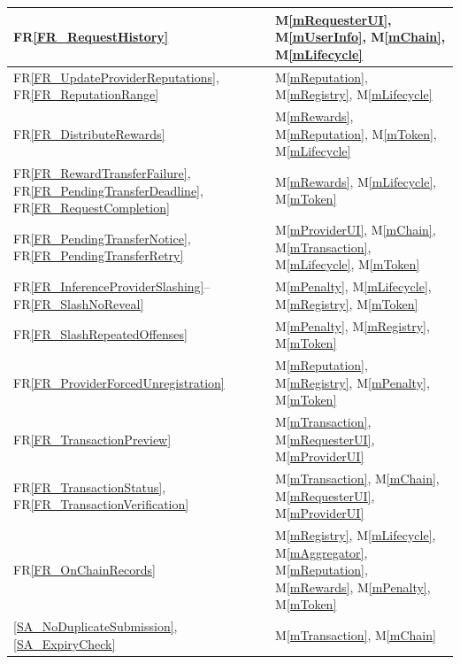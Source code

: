 \documentclass[12pt, titlepage]{article}
\newcommand{\mref}[1]{M\ref{#1}}
\newcommand{\rref}[1]{FR\ref{#1}}
\begin{document}
\begin{longtable}{|p{}|p{}|}
\rref{FR_RequestHistory}
& \mref{mRequesterUI}, \mref{mUserInfo}, \mref{mChain}, \mref{mLifecycle} \\
\hline

\rref{FR_UpdateProviderReputations}, \rref{FR_ReputationRange}
& \mref{mReputation}, \mref{mRegistry}, \mref{mLifecycle} \\
\hline

\rref{FR_DistributeRewards}
& \mref{mRewards}, \mref{mReputation}, \mref{mToken}, \mref{mLifecycle} \\
\hline

\rref{FR_RewardTransferFailure}, \rref{FR_PendingTransferDeadline},
\rref{FR_RequestCompletion}
& \mref{mRewards}, \mref{mLifecycle}, \mref{mToken} \\
\hline

\rref{FR_PendingTransferNotice}, \rref{FR_PendingTransferRetry}
& \mref{mProviderUI}, \mref{mChain}, \mref{mTransaction}, \mref{mLifecycle},
\mref{mToken} \\
\hline

\rref{FR_InferenceProviderSlashing}--\rref{FR_SlashNoReveal}
& \mref{mPenalty}, \mref{mLifecycle}, \mref{mRegistry}, \mref{mToken} \\
\hline

\rref{FR_SlashRepeatedOffenses}
& \mref{mPenalty}, \mref{mRegistry}, \mref{mToken} \\
\hline

\rref{FR_ProviderForcedUnregistration}
& \mref{mReputation}, \mref{mRegistry}, \mref{mPenalty}, \mref{mToken} \\
\hline

\rref{FR_TransactionPreview}
& \mref{mTransaction}, \mref{mRequesterUI}, \mref{mProviderUI} \\
\hline

\rref{FR_TransactionStatus}, \rref{FR_TransactionVerification}
& \mref{mTransaction}, \mref{mChain}, \mref{mRequesterUI},
\mref{mProviderUI} \\
\hline

\rref{FR_OnChainRecords}
& \mref{mRegistry}, \mref{mLifecycle}, \mref{mAggregator},
\mref{mReputation}, \mref{mRewards}, \mref{mPenalty}, \mref{mToken} \\
\hline

\ref{SA_NoDuplicateSubmission}, \ref{SA_ExpiryCheck}
& \mref{mTransaction}, \mref{mChain} \\
\hline


\end{longtable}
\end{document}
